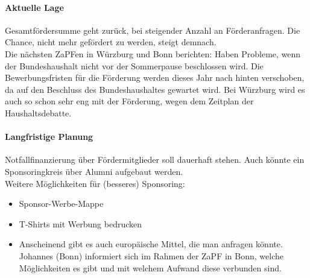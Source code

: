     \paragraph{Aktuelle Lage}
     Gesamtfördersumme geht zurück, bei steigender Anzahl an Förderanfragen. Die Chance, nicht mehr gefördert zu werden, steigt demnach. \\
     Die nächsten ZaPFen in Würzburg und Bonn berichten: Haben Probleme, wenn der Bundeshaushalt nicht vor der Sommerpause beschlossen wird.
     Die Bewerbungsfristen für die Förderung werden dieses Jahr nach hinten verschoben, da auf den Beschluss des Bundeshaushaltes gewartet wird.
     Bei Würzburg wird es auch so schon sehr eng mit der Förderung, wegen dem Zeitplan der Haushaltsdebatte. \\

    \paragraph{Langfristige Planung}
      Notfallfinanzierung über Fördermitglieder soll dauerhaft stehen. Auch könnte ein Sponsoringkreis über Alumni aufgebaut werden. \\

      Weitere Möglichkeiten für (besseres) Sponsoring:
      \begin{itemize}
        \item Sponsor-Werbe-Mappe
        \item T-Shirts mit Werbung bedrucken
        \item Anscheinend gibt es auch europäische Mittel, die man anfragen könnte. Johannes (Bonn) informiert sich im Rahmen der ZaPF in Bonn, welche Möglichkeiten es gibt und mit welchem Aufwand diese verbunden sind.
      \end{itemize}
